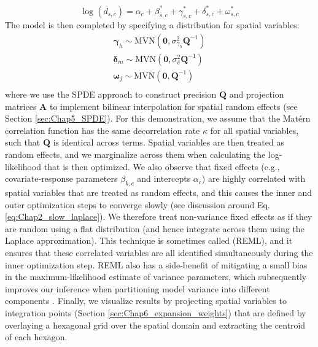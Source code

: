 \begin{equation} \label{eq:Chap11_JSDM}
    \log(d_{s,c}) = \alpha_c + \beta_{s,c}^* + \gamma_{s,c}^* + \delta_{s,c}^* + \omega_{s,c}^*
\end{equation}
The model is then completed by specifying a distribution for spatial variables:
\begin{equation}
\begin{gathered}
  \mathbf{\gamma}_h \sim \mathrm{MVN}( \mathbf{0}, \sigma_{\gamma_h}^2 \mathbf{Q}^{-1} ) \\
  \mathbf{\delta}_m \sim \mathrm{MVN}( \mathbf{0}, \sigma_{\delta}^2 \mathbf{Q}^{-1} ) \\
  \mathbf{\omega}_j \sim \mathrm{MVN}( \mathbf{0}, \mathbf{Q}^{-1} ) \\
\end{gathered}
\end{equation}
where we use the SPDE approach to construct precision \(\mathbf{Q}\) and projection matrices \(\mathbf{A}\) to implement bilinear interpolation for spatial random effects (see Section \ref{sec:Chap5_SPDE}).  For this demonstration, we assume that the Matérn correlation function has the same decorrelation rate \(\kappa\) for all spatial variables, such that \(\mathbf{Q}\) is identical across terms.  Spatial variables are then treated as random effects, and we marginalize across them when calculating the log-likelihood that is then optimized.  We also observe that fixed effects (e.g., covariate-response parameters \(\beta_{k,c}\) and intercepts \(\alpha_c\)) are highly correlated with spatial variables that are treated as random effects, and this causes the inner and outer optimization steps to converge slowly (see discussion around Eq. \ref{eq:Chap2_slow_laplace}).  We therefore treat non-variance fixed effects as if they are random using a flat distribution (and hence integrate across them using the Laplace approximation).  This technique is sometimes called  (REML), and it ensures that these correlated variables are all identified simultaneously during the inner optimization step.  REML also has a side-benefit of mitigating a small bias in the maximum-likelihood estimate of variance parameters, which subsequently improves our inference when partitioning model variance into different components \cite{harville_bayesian_1974}.  Finally, we visualize results by projecting spatial variables to integration points (Section \ref{sec:Chap6_expansion_weights}) that are defined by overlaying a hexagonal grid over the spatial domain and extracting the centroid of each hexagon.    

